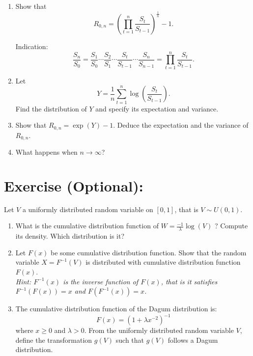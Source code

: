 \documentclass[12pt,thmsa]{article}
\begin{document}
\begin{enumerate}
\begin{enumerate}
  \item Show that  $$R_{0,n}=\left( \prod_{t=1}^{n} \frac{S_t}{S_{t-1}} \right)^{\frac{1}{n}} -1.$$ 

{Indication:}
$$
\frac{S_n}{S_0}= \frac{S_1}{S_0} \cdots \frac{S_2}{S_1} \cdots
\frac{S_t}{S_{t-1}} \cdots \frac{S_n}{S_{n-1}}= \prod_{t=1}^{n}
\frac{S_t}{S_{t-1}}.
$$
  \item Let $$Y=\frac{1}{n} \sum_{t=1}^{n} \log\left( \frac{S_t}{S_{t-1}} \right).$$ Find the distribution of $Y$ and specify its expectation and variance.
  \item Show that $R_{0,n}=\exp(Y)-1$. Deduce the expectation and the variance of $R_{0,n}$.
  \item What happens when $n \rightarrow \infty$?



\end{enumerate}


\newpage
\addtocounter{section}{1}
\section*{ Exercise \thesection (Optional):}

Let $V$ a uniformly distributed random variable on $[0,1]$, that is $V \sim U(0,1)$.
\begin{enumerate}
  \item What is the cumulative distribution function of $W=\frac{-1}{\lambda} \log(V)$ ? Compute its density. Which distribution is it?
  \item Let $F(x)$ be some cumulative distribution function. Show that the random variable $X=F^{-1}(V)$ is distributed with cumulative distribution function $F(x)$. \\
  \emph{Hint: $F^{-1}(x)$ is the inverse function of $F(x)$, that is it satisfies $F^{-1}(F(x))=x$ and $F(F^{-1}(x))=x$.}
  \item The cumulative
  distribution function of the Dagum distribution is:
  \begin{equation*}
  F(x)=(1+\lambda x^{-2})^{-1}
  \end{equation*}
where $x\geq 0$ and $\lambda>0$.
From the uniformly distributed random variable $V$, define the transformation $g(V)$ such that $g(V)$ follows a Dagum distribution.

\end{enumerate}

\end{enumerate}
\end{document}
